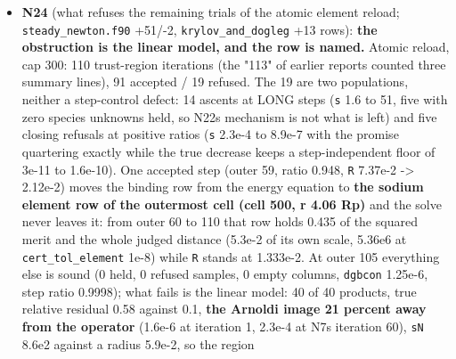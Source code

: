 \documentclass[english,a4paper]{my_memo}
\begin{document}
\begin{itemize}
  removed. Tests RED (four symbols absent), GREEN 136/0; \texttt{steady\_species\_\ rows} 182/0; \texttt{-Wall} warnings 6 before and after. Advisor: rebuild
  warning-free, the two suites 136/0 and 182/0 on \texttt{build\_lwv} (the object
  md5 differs from the worker\textquotesingle s delivered one by a post-measurement comment
  edit that moved line numbers, which the I/O statements carry; the
  worker\textquotesingle s line-for-line reproduction of the solve covers it). Not
  converged; the rule is not claimed to improve either fixture. Reported:
  \texttt{cauchy\_leg\_min\_fraction} is now a proxy for a test the code can make
  directly (letting the image test alone decide is the next increment, not
  taken because no fixture exercises the difference); the trial diagnostic\textquotesingle s
  evaluations enter the cost counters.
\item
  \textbf{N24} (what refuses the remaining trials of the atomic element reload;
  \texttt{steady\_newton.f90} +51/-2, \texttt{krylov\_and\_dogleg} +13 rows): \textbf{the
  obstruction is the linear model, and the row is named.} Atomic reload,
  cap 300: 110 trust-region iterations (the "113" of earlier reports counted
  three summary lines), 91 accepted / 19 refused. The 19 are two
  populations, neither a step-control defect: 14 ascents at LONG steps
  (\texttt{\textbar{}\textbar{}s\textbar{}\textbar{}} 1.6 to 51, five with zero species unknowns held, so N22\textquotesingle s
  mechanism is not what is left) and five closing refusals at positive
  ratios (\texttt{\textbar{}\textbar{}s\textbar{}\textbar{}} 2.3e-4 to 8.9e-7 with the promise quartering exactly while
  the true decrease keeps a step-independent floor of 3e-11 to 1.6e-10). One
  accepted step (outer 59, ratio 0.948, \texttt{\textbar{}\textbar{}R\textbar{}\textbar{}} 7.37e-2 -\textgreater{} 2.12e-2) moves the
  binding row from the energy equation to \textbf{the sodium element row of the
  outermost cell (cell 500, r 4.06 Rp)} and the solve never leaves it:
  from outer 60 to 110 that row holds 0.435 of the squared merit and the
  whole judged distance (5.3e-2 of its own scale, 5.36e6 at
  \texttt{cert\_tol\_element} 1e-8) while \texttt{\textbar{}\textbar{}R\textbar{}\textbar{}} stands at 1.333e-2. At outer 105
  everything else is sound (0 held, 0 refused samples, 0 empty columns,
  \texttt{dgbcon} 1.25e-6, step ratio 0.9998); what fails is the linear model: 40
  of 40 products, true relative residual 0.58 against 0.1, \textbf{the Arnoldi
  image 21 percent away from the operator} (1.6e-6 at iteration 1, 2.3e-4 at
  N7\textquotesingle s iteration 60), \texttt{\textbar{}\textbar{}sN\textbar{}\textbar{}} 8.6e2 against a radius 5.9e-2, so the region

\end{itemize}
\end{document}

